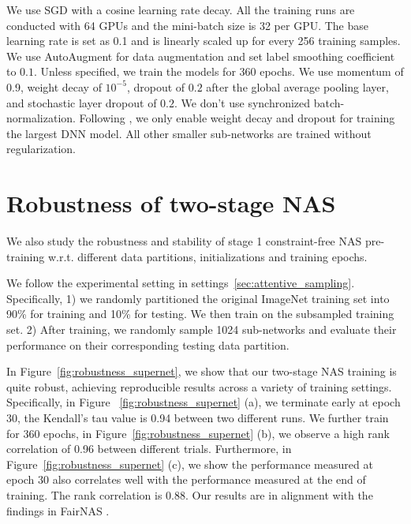 \documentclass[final]{cvpr}
\theoremstyle{definition}
\begin{document}
We use SGD with a cosine learning rate decay. All the training runs are conducted with 64 GPUs and the mini-batch size is 32 per GPU. 
The base learning rate is set as 0.1 and is linearly scaled up for every 256 training samples.
We use AutoAugment \cite{cubuk2018autoaugment} for data augmentation and set label smoothing coefficient to $0.1$.
Unless specified, we train the models for 360 epochs.
We use momentum of 0.9, weight decay of $10^{-5}$, 
dropout of $0.2$ after the global average pooling layer, and stochastic layer dropout of $0.2$.  We don't use synchronized batch-normalization. 
Following \cite{yu2020bignas}, we only enable weight decay and dropout 
for training the largest DNN model. All other smaller sub-networks are trained without regularization.  


\section{Robustness of two-stage NAS}
\label{app:sec_robustness}

We also study the robustness and stability of stage 1 constraint-free NAS pre-training w.r.t. different data partitions, initializations and training epochs.

We follow the experimental setting in settings~\ref{sec:attentive_sampling}. 
Specifically, 1) we randomly partitioned the original ImageNet training set into 90\% for training and 10\% for testing. 
We then train on the subsampled training set. 
2) After training, we randomly sample 1024 sub-networks and evaluate their performance on their corresponding testing data partition.  

In Figure~\ref{fig:robustness_supernet}, 
we show that our two-stage NAS training is quite robust, achieving reproducible results across a variety of training settings. Specifically, 
in Figure ~\ref{fig:robustness_supernet} (a), we terminate early at epoch 30, the Kendall's tau value is 0.94 between two different runs. 
We further train for 360 epochs, in Figure~\ref{fig:robustness_supernet} (b), we observe a high rank correlation of 0.96 between different trials. 
Furthermore, in Figure~\ref{fig:robustness_supernet} (c), we show the performance measured at epoch 30 also correlates well with the performance measured at the end of training. The rank correlation is 0.88. 
Our results are in alignment with the findings in FairNAS \cite{chu2019fairnas}.
\end{document}
